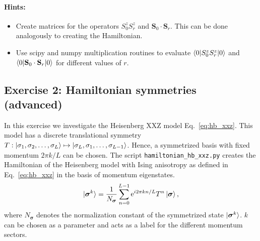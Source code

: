 \documentclass[]{article}
\theoremstyle{definition}
\begin{document}
\begin{enumerate}[label=(\alph*)]
  \paragraph{Hints:}
  \begin{itemize}
  \item Create matrices for the operators $S^z_0S^z_r$ and
    $\mathbf{S}_0\cdot\mathbf{S}_r$. This can be done analogously to
    creating the Hamiltonian.
  \item Use scipy and numpy multiplication routines to evaluate
    $\braket{0|S^z_0S^z_r|0}$ and
    $\braket{0|\mathbf{S}_0\cdot\mathbf{S}_r|0}$ for different values
    of $r$.
  \end{itemize}
\end{enumerate}

\newpage
\subsection*{Exercise 2: Hamiltonian symmetries (advanced)}
In this exercise we investigate the Heisenberg XXZ model
Eq.~\ref{eq:hb_xxz}. This model has a discrete translational symmetry
$T:\ket{\sigma_1, \sigma_2, \ldots, \sigma_L} \mapsto \ket{\sigma_L,
  \sigma_1, \ldots, \sigma_{L-1}}$. Hence, a symmetrized basis with
fixed momentum $2\pi k / L$ can be chosen. The script
\texttt{hamiltonian\_hb\_xxz.py} creates the Hamiltonian of the
Heisenberg model with Ising anisotropy as defined in
Eq.~\ref{eq:hb_xxz} in the basis of momentum eigenstates.
$$
\ket{\bm{\sigma}^k} = \frac{1}{N_{\bm{\sigma}}}
\sum_{n=0}^{L-1}\text{e}^{i2\pi k n / L}T^n\ket{\bm{\sigma}},
$$
where $N_{\bm{\sigma}}$ denotes the normalization constant of the
symmetrized state $\ket{\bm{\sigma}^k}$.  $k$ can be
chosen as a parameter and acts as a label for the different momentum
sectors.
\end{document}
